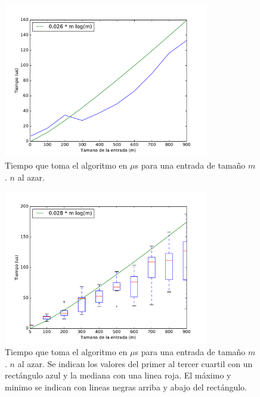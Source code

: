 

\begin{figure}[H]
 \centering
	\includegraphics[width=0.8\textwidth]{img/exp/problema2-promedio.pdf}
	\caption{\footnotesize Tiempo que toma el algoritmo en $\mu$s para una entrada de tamaño $m$. $n$ al azar.}
	\label{fig:problema2-promedio}
\end{figure}

\begin{figure}[H]
 \centering
	\includegraphics[width=0.8\textwidth]{img/exp/problema2-promedio2.pdf}
  \caption{\footnotesize Tiempo que toma el algoritmo en $\mu$s para una entrada de tamaño $m$. $n$ al azar. Se indican los valores del primer al tercer cuartil con un rectángulo azul y la mediana con una linea roja. El máximo y minimo se indican con lineas negras arriba y abajo del rectángulo.}
	\label{fig:problema2-promedio2}
\end{figure}

